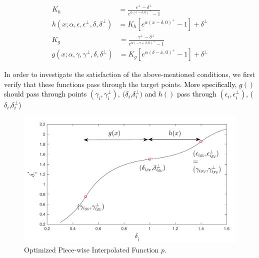 \begin{align}\label{eq:basicfunctions}
K_h &= \frac{\epsilon^{\perp}-\delta^{\perp}}{e^{\alpha(\epsilon-\delta,0)^{+}}-1}\\ \nonumber
h(x;\alpha,\epsilon,\epsilon^{\perp},\delta,\delta^{\perp}) &= K_h[e^{\alpha(x-\delta,0)^{+}}-1] + \delta^{\perp}
\end{align}
\begin{align}
K_g &= \frac{\gamma^{\perp}-\delta^{\perp}}{e^{\alpha(-\gamma+\delta,0)^{+}}-1}\\ \nonumber
g(x;\alpha,\gamma,\gamma^{\perp},\delta,\delta^{\perp}) &= K_g[e^{\alpha(\delta-x,0)^{+}}-1] + \delta^{\perp}
\end{align}



In order to investigate the satisfaction of the above-mentioned conditions, we first verify that these functions pass through the target points. \textcolor{black}{More specifically, $g()$ should pass through points $(\gamma_{i},\gamma^{\perp}_{i}),~(\delta_{i}$,$\delta^{\perp}_{i})$ 
and $h()$ pass through $(\epsilon_{i},\epsilon^{\perp}_{i})$,  ($\delta_{i}$,$\delta^{\perp}_{i}$)} %

\begin{figure}[t]
\centering
\includegraphics[scale=.7]{Fig/optimized_single_v2_croped.pdf}
\caption{Optimized Piece-wise Interpolated Function $p$.} %
\label{fig:optimized_p}
\end{figure}

